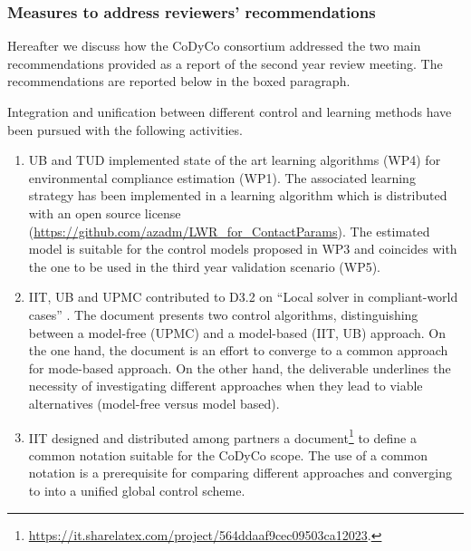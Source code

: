\documentclass[12pt,a4paper,twoside]{article}
\begin{document}
\subsubsection*{Measures to address reviewers' recommendations}

Hereafter we discuss how the CoDyCo consortium addressed the two main recommendations provided as a report of the second year review meeting. The recommendations are reported below in the boxed paragraph.


\medskip
\noindent 
Integration and unification between different control and learning methods have been pursued with the following activities. 

\begin{enumerate}
\item UB and TUD implemented state of the art learning algorithms (WP4) for environmental compliance estimation (WP1). The associated learning strategy has been implemented in a learning algorithm which is distributed with an open source license (\url{https://github.com/azadm/LWR_for_ContactParams}). The estimated model is suitable for the control models proposed in WP3 and coincides with the one to be used in the third year validation scenario (WP5). 

\item IIT, UB and UPMC contributed to D3.2 on ``Local solver in compliant-world cases'' \cite{deliverable32}. The document presents two control algorithms, distinguishing between a model-free (UPMC) and a model-based (IIT, UB) approach. On the one hand, the document is an effort to converge to a common approach for mode-based approach. On the other hand, the deliverable underlines the necessity of investigating different approaches when they lead to viable alternatives (model-free versus model based). 

\item IIT designed and distributed among partners a document\footnote{\url{https://it.sharelatex.com/project/564ddaaf9cec09503ca12023}.} to define a common notation suitable for the CoDyCo scope. The use of a common notation is a prerequisite for comparing different approaches and converging to into a unified global control scheme. 
\end{enumerate}
\end{document}
